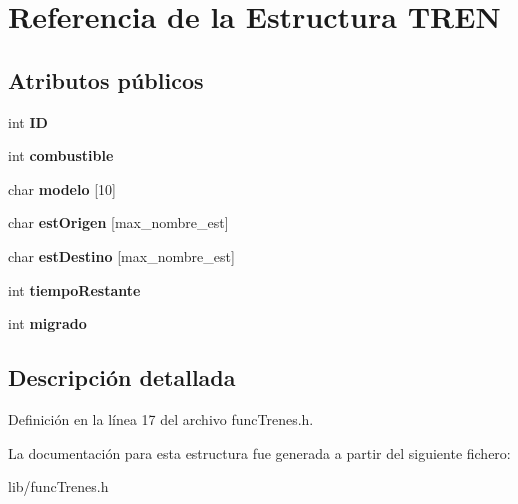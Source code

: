 \hypertarget{structTREN}{}\section{Referencia de la Estructura T\+R\+EN}
\label{structTREN}
\subsection*{Atributos públicos}
\begin{DoxyCompactItemize}
\item 
\mbox{\label{structTREN_a43cea43e84e3275eb1a0a2e8605562e5}} 
int {\bfseries ID}
\item 
\mbox{\label{structTREN_a524f3fda8e110d095498c06970d9d152}} 
int {\bfseries combustible}
\item 
\mbox{\label{structTREN_af25bb44a4e53f11bf29f10ba75ab7165}} 
char {\bfseries modelo} \mbox{[}10\mbox{]}
\item 
\mbox{\label{structTREN_a80fca1e3e843ddc9be1e20dc23da6e9f}} 
char {\bfseries est\+Origen} \mbox{[}max\+\_\+nombre\+\_\+est\mbox{]}
\item 
\mbox{\label{structTREN_a7b2410dcd75343e2d8ce70bf2c9e5162}} 
char {\bfseries est\+Destino} \mbox{[}max\+\_\+nombre\+\_\+est\mbox{]}
\item 
\mbox{\label{structTREN_aa340a154137e45caaa9b48cf59c625db}} 
int {\bfseries tiempo\+Restante}
\item 
\mbox{\label{structTREN_ab66dfa351def8947cf7782907b7fd55e}} 
int {\bfseries migrado}
\end{DoxyCompactItemize}


\subsection{Descripción detallada}


Definición en la línea 17 del archivo func\+Trenes.\+h.



La documentación para esta estructura fue generada a partir del siguiente fichero\+:\begin{DoxyCompactItemize}
\item 
lib/func\+Trenes.\+h\end{DoxyCompactItemize}
